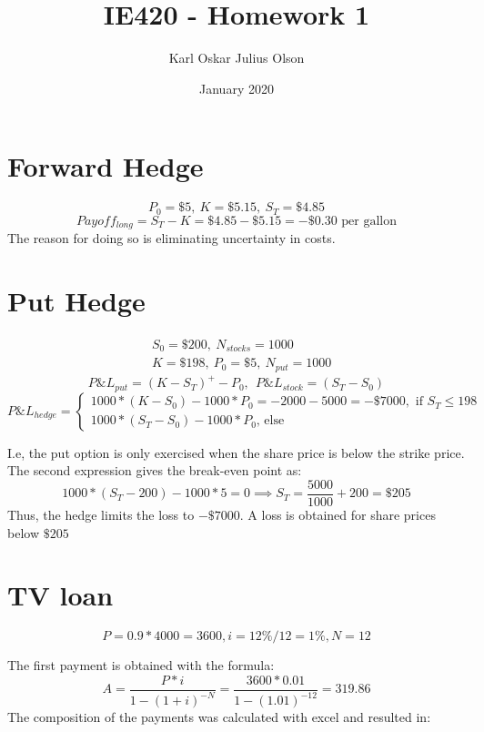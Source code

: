 \documentclass{article}
\title{IE420 - Homework 1}
\author{Karl Oskar Julius Olson}
\date{January 2020}
\begin{document}
\thispagestyle{fancy}


\section*{Forward Hedge}

$$ P_0 = \$5, \  K = \$5.15, \ S_T = \$ 4.85$$
$$Payoff_{long} = S_T - K = \$4.85 - \$5.15 = -\$0.30 \text{ per gallon} $$
The reason for doing so is eliminating uncertainty in costs. 
\section*{Put Hedge}
\begin{align*}
	&S_0 = \$200, \ N_{stocks} = 1000 \\
	&K = \$198, \ P_0 = \$5, \ N_{put} = 1000
\end{align*}
$$P\&L_{put} = (K-S_T)^+ - P_0, \ \ P\&L_{stock} = (S_T - S_0)$$
$$P\&L_{hedge} = \begin{cases} 1000 * (K - S_0) - 1000 * P_0 = -2000 - 5000 = -\$7000, \text{ if $S_T \leq 198$ } \\ 1000*(S_T - S_0) - 1000*P_0  \text{, else} \end{cases} $$

I.e, the put option is only exercised when the share price is below the strike price. The second expression gives the break-even point as:
$$1000 * (S_T- 200)-1000 * 5 = 0 \implies S_T = \frac{5000}{1000} + 200 = \$205$$
Thus, the hedge limits the loss to $-\$7000$. A loss is obtained for share prices below $\$205$


\section*{TV loan}

$$P = 0.9 * 4000 = 3600, i = 12\% / 12 = 1\%, N = 12$$

The first payment is obtained with the formula: 
$$A = \frac{P*i}{1-(1+i)^{-N}} = \frac{3600 * 0.01}{1-(1.01)^{-12}} = 319.86$$
The composition of the payments was calculated with excel and resulted in:

\begin{table}[H]
	\begin{center}
\end{center}
\end{table}
\end{document}
